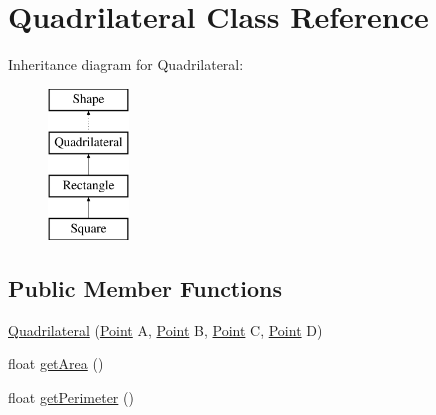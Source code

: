 \hypertarget{class_quadrilateral}{}\section{Quadrilateral Class Reference}
\label{class_quadrilateral}
Inheritance diagram for Quadrilateral\+:\begin{figure}[H]
\begin{center}
\leavevmode
\includegraphics[height=4.000000cm]{class_quadrilateral}
\end{center}
\end{figure}
\subsection*{Public Member Functions}
\begin{DoxyCompactItemize}
\item 
\mbox{\hyperlink{class_quadrilateral_accb7341bd0b9589fc9d672822b5b3f8d}{Quadrilateral}} (\mbox{\hyperlink{class_point}{Point}} A, \mbox{\hyperlink{class_point}{Point}} B, \mbox{\hyperlink{class_point}{Point}} C, \mbox{\hyperlink{class_point}{Point}} D)
\item 
float \mbox{\hyperlink{class_quadrilateral_a254b3672c291adf79536ddb5de67f31d}{get\+Area}} ()
\item 
float \mbox{\hyperlink{class_quadrilateral_a6cbaf55455f983553b5fd8ff10c73a57}{get\+Perimeter}} ()
\end{DoxyCompactItemize}
